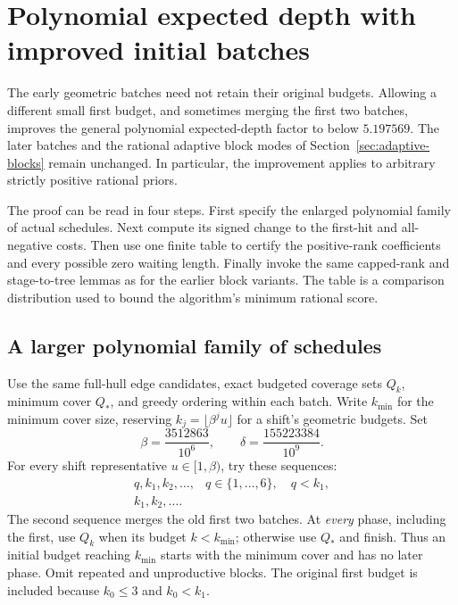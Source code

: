 \section{Polynomial expected depth with improved initial batches}
\label{sec:first-phase}

The early geometric batches need not retain their original budgets.
Allowing a different small first budget, and sometimes merging the first
two batches, improves the general polynomial expected-depth factor to
below $5.197569$. The later batches and the rational adaptive block modes
of Section~\ref{sec:adaptive-blocks} remain unchanged. In particular, the
improvement applies to arbitrary strictly positive rational priors.

The proof can be read in four steps. First specify the enlarged
polynomial family of actual schedules. Next compute its signed change
to the first-hit and all-negative costs. Then use one finite table to
certify the positive-rank coefficients and every possible zero waiting
length. Finally invoke the same capped-rank and stage-to-tree lemmas
as for the earlier block variants. The table is a comparison
distribution used to bound the algorithm's minimum rational score.

\subsection{A larger polynomial family of schedules}

Use the same full-hull edge candidates, exact budgeted coverage sets
$Q_k$, minimum cover $Q_*$, and greedy ordering within each batch.
Write $k_{\min}$ for the minimum cover size, reserving
$k_j=\lfloor\beta^ju\rfloor$ for a shift's geometric budgets. Set
\begin{equation}\label{eq:first-phase-parameters}
 \beta=\frac{3512863}{10^6},\qquad
 \delta=\frac{155223384}{10^9}.
\end{equation}
For every shift representative $u\in[1,\beta)$, try these sequences:
\[
 \begin{array}{ll}
 q,k_1,k_2,\ldots,&q\in\{1,\ldots,6\},\quad q<k_1,\\
 k_1,k_2,\ldots.&
 \end{array}
\]
The second sequence merges the old first two batches. At \emph{every}
phase, including the first, use $Q_k$ when its budget $k<k_{\min}$;
otherwise use $Q_*$ and finish. Thus an initial budget reaching
$k_{\min}$ starts with the minimum cover and has no later phase.
Omit repeated and unproductive blocks. The original first budget is
included because $k_0\le3$ and $k_0<k_1$.

